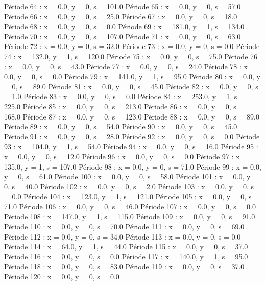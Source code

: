 Période 64 : x = 0.0, y = 0, s = 101.0
Période 65 : x = 0.0, y = 0, s = 57.0
Période 66 : x = 0.0, y = 0, s = 25.0
Période 67 : x = 0.0, y = 0, s = 18.0
Période 68 : x = 0.0, y = 0, s = 0.0
Période 69 : x = 181.0, y = 1, s = 134.0
Période 70 : x = 0.0, y = 0, s = 107.0
Période 71 : x = 0.0, y = 0, s = 63.0
Période 72 : x = 0.0, y = 0, s = 32.0
Période 73 : x = 0.0, y = 0, s = 0.0
Période 74 : x = 132.0, y = 1, s = 120.0
Période 75 : x = 0.0, y = 0, s = 75.0
Période 76 : x = 0.0, y = 0, s = 43.0
Période 77 : x = 0.0, y = 0, s = 24.0
Période 78 : x = 0.0, y = 0, s = 0.0
Période 79 : x = 141.0, y = 1, s = 95.0
Période 80 : x = 0.0, y = 0, s = 89.0
Période 81 : x = 0.0, y = 0, s = 45.0
Période 82 : x = 0.0, y = 0, s = 1.0
Période 83 : x = 0.0, y = 0, s = 0.0
Période 84 : x = 253.0, y = 1, s = 225.0
Période 85 : x = 0.0, y = 0, s = 213.0
Période 86 : x = 0.0, y = 0, s = 168.0
Période 87 : x = 0.0, y = 0, s = 123.0
Période 88 : x = 0.0, y = 0, s = 89.0
Période 89 : x = 0.0, y = 0, s = 54.0
Période 90 : x = 0.0, y = 0, s = 45.0
Période 91 : x = 0.0, y = 0, s = 28.0
Période 92 : x = 0.0, y = 0, s = 0.0
Période 93 : x = 104.0, y = 1, s = 54.0
Période 94 : x = 0.0, y = 0, s = 16.0
Période 95 : x = 0.0, y = 0, s = 12.0
Période 96 : x = 0.0, y = 0, s = 0.0
Période 97 : x = 135.0, y = 1, s = 107.0
Période 98 : x = 0.0, y = 0, s = 71.0
Période 99 : x = 0.0, y = 0, s = 61.0
Période 100 : x = 0.0, y = 0, s = 58.0
Période 101 : x = 0.0, y = 0, s = 40.0
Période 102 : x = 0.0, y = 0, s = 2.0
Période 103 : x = 0.0, y = 0, s = 0.0
Période 104 : x = 123.0, y = 1, s = 121.0
Période 105 : x = 0.0, y = 0, s = 71.0
Période 106 : x = 0.0, y = 0, s = 46.0
Période 107 : x = 0.0, y = 0, s = 0.0
Période 108 : x = 147.0, y = 1, s = 115.0
Période 109 : x = 0.0, y = 0, s = 91.0
Période 110 : x = 0.0, y = 0, s = 70.0
Période 111 : x = 0.0, y = 0, s = 69.0
Période 112 : x = 0.0, y = 0, s = 34.0
Période 113 : x = 0.0, y = 0, s = 0.0
Période 114 : x = 64.0, y = 1, s = 44.0
Période 115 : x = 0.0, y = 0, s = 37.0
Période 116 : x = 0.0, y = 0, s = 0.0
Période 117 : x = 140.0, y = 1, s = 95.0
Période 118 : x = 0.0, y = 0, s = 83.0
Période 119 : x = 0.0, y = 0, s = 37.0
Période 120 : x = 0.0, y = 0, s = 0.0



